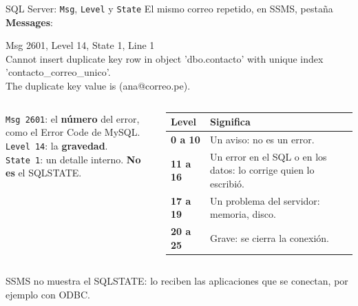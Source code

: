 \documentclass[aspectratio=169,10pt,c]{beamer}
\newcommand{\gris}[1]{\textcolor{utpGris}{#1}}
\newcommand{\npieza}[1]{\tikz[baseline=-0.6ex]{\node[circle,fill=utpRojo,text=white,
  font=\bfseries\scriptsize,inner sep=1.6pt,minimum size=4.2mm] {#1};}}
\newcommand{\dentro}[1]{{\setlength{\fboxsep}{1.5pt}\colorbox{yellow!45}{#1}}}
\newenvironment{sqlmicro}[1][.86\textwidth]
  {\begin{center}\begin{lrbox}{\sqlbuf}\begin{minipage}{#1}\ttfamily\fontsize{6.4}{7.5}\selectfont\vspace{4pt}\raggedright}
  {\vspace{4pt}\end{minipage}\end{lrbox}\colorbox{utpGrisClaro}{\usebox{\sqlbuf}}\end{center}}
\newcommand{\err}[1]{\textcolor{utpRojo}{#1}}
\begin{document}
\begin{frame}{SQL Server: \texttt{Msg}, \texttt{Level} y \texttt{State}}
\small El mismo correo repetido, en SSMS, pestaña \textbf{Messages}:
\vspace{0.05cm}
\begin{sqlmicro}[.95\textwidth]
\err{Msg \dentro{2601}, Level \dentro{14}, State \dentro{1}, Line 1}\\
\err{Cannot insert duplicate key row in object 'dbo.contacto' with unique index 'contacto\_correo\_unico'.}\\
\err{The duplicate key value is (ana@correo.pe).}
\end{sqlmicro}
\vspace{-0.05cm}
\begin{columns}[T,onlytextwidth]
\small\raggedright
\npieza{1} \texttt{Msg 2601}: el \textbf{número} del error, como el Error Code de MySQL.\\[5pt]
\npieza{2} \texttt{Level 14}: la \textbf{gravedad}.\\[5pt]
\npieza{3} \texttt{State 1}: un detalle interno. \textbf{No es} el SQLSTATE.
\footnotesize
\renewcommand{\arraystretch}{1.2}
\begin{tabular}{@{}>{\bfseries}l>{\raggedright\arraybackslash}p{4.9cm}@{}}
\toprule
Level & \bfseries Significa \\
\midrule
0 a 10 & Un aviso: no es un error. \\
11 a 16 & Un error en el SQL o en los datos: lo corrige quien lo escribió. \\
17 a 19 & Un problema del servidor: memoria, disco. \\
20 a 25 & Grave: se cierra la conexión. \\
\bottomrule
\end{tabular}
\end{columns}
\vspace{0.2cm}
{\centering\scriptsize\gris{SSMS no muestra el SQLSTATE: lo reciben las aplicaciones que se conectan, por ejemplo con ODBC.}\par}
\end{frame}
\end{document}
